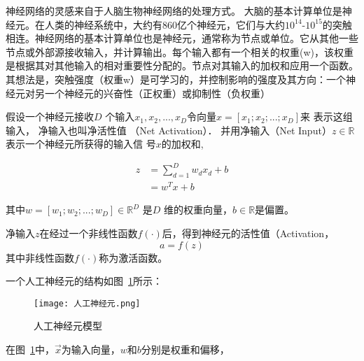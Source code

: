 神经网络的灵感来自于人脑生物神经网络的处理方式。
大脑的基本计算单位是神经元。在人类的神经系统中，大约有860亿个神经元，它们与大约$10^{14}$-$10^{15}$的突触相连。神经网络的基本计算单位也是神经元，通常称为节点或单位。它从其他一些节点或外部源接收输入，并计算输出。每个输入都有一个相关的权重(w)，该权重是根据其对其他输入的相对重要性分配的。节点对其输入的加权和应用一个函数。
其想法是，突触强度（权重w）是可学习的，并控制影响的强度及其方向：一个神经元对另一个神经元的兴奋性（正权重）或抑制性（负权重）

假设一个神经元接收$𝐷$ 个输入$x_1,x_2,...,x_D$令向量$x=[x_1;x_2;...;x_D]$来
表示这组输入， 净输入也叫净活性值
（Net Activation）．
并用净输入（Net Input）$z\in \mathbb{R}$表示一个神经元所获得的输入信
号$x$的加权和,

\begin{equation}
\begin{aligned}    
    z &= \sum_{d=1}^D w_d x_d + b \\
      &= w^Tx + b        
\end{aligned}    
\end{equation}

其中$w=[w_1;w_2;...;w_D] \in \mathbb{R}^D$ 是$𝐷$ 维的权重向量，$b\in \mathbb{R}$是偏置。


净输入$𝑧$在经过一个非线性函数$f(\cdot)$后，得到神经元的活性值（Activation，
\begin{equation}
    a = f(z)
\end{equation}
其中非线性函数$f(\cdot)$称为激活函数。

一个人工神经元的结构如图~\ref{fig:神经元}所示：
\begin{figure}
    \centering
    \texttt{[image: 人工神经元.png]}
    \caption{人工神经元模型}
    \label{fig:神经元}
  \end{figure}

在图~\ref{fig:神经元}中，$\vec{x}$为输入向量，$w$和$b$分别是权重和偏移，

